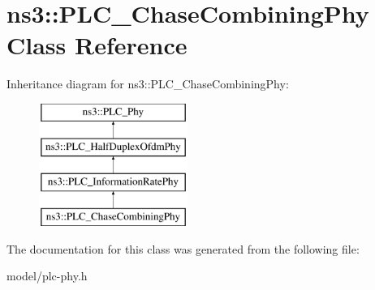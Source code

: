 \hypertarget{classns3_1_1PLC__ChaseCombiningPhy}{\section{ns3\-:\-:\-P\-L\-C\-\_\-\-Chase\-Combining\-Phy \-Class \-Reference}
\label{classns3_1_1PLC__ChaseCombiningPhy}
}
\-Inheritance diagram for ns3\-:\-:\-P\-L\-C\-\_\-\-Chase\-Combining\-Phy\-:\begin{figure}[H]
\begin{center}
\leavevmode
\includegraphics[height=4.000000cm]{classns3_1_1PLC__ChaseCombiningPhy}
\end{center}
\end{figure}


\-The documentation for this class was generated from the following file\-:\begin{DoxyCompactItemize}
\item 
model/plc-\/phy.\-h\end{DoxyCompactItemize}
